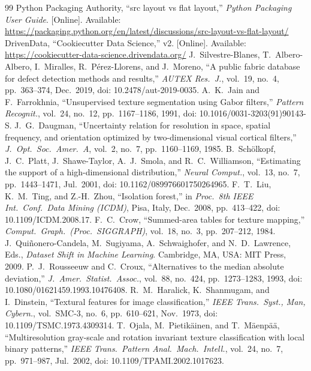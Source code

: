 \documentclass[11pt,a4paper]{article}
\begin{document}
\begin{thebibliography}{99}
\small
{} Python Packaging Authority, ``src layout vs flat layout,'' \emph{Python Packaging User Guide}. [Online]. Available: \url{https://packaging.python.org/en/latest/discussions/src-layout-vs-flat-layout/}
 DrivenData, ``Cookiecutter Data Science,'' v2. [Online]. Available: \url{https://cookiecutter-data-science.drivendata.org/}
 J.~Silvestre-Blanes, T.~Albero-Albero, I.~Miralles, R.~P\'erez-Llorens, and J.~Moreno, ``A public fabric database for defect detection methods and results,'' \emph{AUTEX Res.\ J.}, vol.~19, no.~4, pp.~363--374, Dec.\ 2019, doi: 10.2478/aut-2019-0035.
 A.~K.~Jain and F.~Farrokhnia, ``Unsupervised texture segmentation using Gabor filters,'' \emph{Pattern Recognit.}, vol.~24, no.~12, pp.~1167--1186, 1991, doi: 10.1016/0031-3203(91)90143-S.
 J.~G.~Daugman, ``Uncertainty relation for resolution in space, spatial frequency, and orientation optimized by two-dimensional visual cortical filters,'' \emph{J.\ Opt.\ Soc.\ Amer.\ A}, vol.~2, no.~7, pp.~1160--1169, 1985.
 B.~Sch\"olkopf, J.~C.~Platt, J.~Shawe-Taylor, A.~J.~Smola, and R.~C.~Williamson, ``Estimating the support of a high-dimensional distribution,'' \emph{Neural Comput.}, vol.~13, no.~7, pp.~1443--1471, Jul.\ 2001, doi: 10.1162/089976601750264965.
 F.~T.~Liu, K.~M.~Ting, and Z.-H.~Zhou, ``Isolation forest,'' in \emph{Proc.\ 8th IEEE Int.\ Conf.\ Data Mining (ICDM)}, Pisa, Italy, Dec.\ 2008, pp.~413--422, doi: 10.1109/ICDM.2008.17.
 F.~C.~Crow, ``Summed-area tables for texture mapping,'' \emph{Comput.\ Graph.\ (Proc.\ SIGGRAPH)}, vol.~18, no.~3, pp.~207--212, 1984.
 J.~Qui\~nonero-Candela, M.~Sugiyama, A.~Schwaighofer, and N.~D.~Lawrence, Eds., \emph{Dataset Shift in Machine Learning}. Cambridge, MA, USA: MIT Press, 2009.
 P.~J.~Rousseeuw and C.~Croux, ``Alternatives to the median absolute deviation,'' \emph{J.\ Amer.\ Statist.\ Assoc.}, vol.~88, no.~424, pp.~1273--1283, 1993, doi: 10.1080/01621459.1993.10476408.
 R.~M.~Haralick, K.~Shanmugam, and I.~Dinstein, ``Textural features for image classification,'' \emph{IEEE Trans.\ Syst., Man, Cybern.}, vol.~SMC-3, no.~6, pp.~610--621, Nov.\ 1973, doi: 10.1109/TSMC.1973.4309314.
 T.~Ojala, M.~Pietik\"ainen, and T.~M\"aenp\"a\"a, ``Multiresolution gray-scale and rotation invariant texture classification with local binary patterns,'' \emph{IEEE Trans.\ Pattern Anal.\ Mach.\ Intell.}, vol.~24, no.~7, pp.~971--987, Jul.\ 2002, doi: 10.1109/TPAMI.2002.1017623.
\end{thebibliography}
\end{document}
